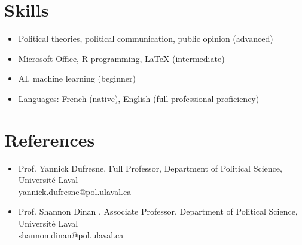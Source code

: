 \documentclass[11pt,letterpaper,sans]{moderncv}        %
\begin{document}
\section{Skills}
\begin{itemize}
  \item Political theories, political communication, public opinion (advanced)
  \item Microsoft Office, R programming, \LaTeX{} (intermediate)
  \item AI, machine learning (beginner)
  \item Languages: French (native), English (full professional proficiency)
\end{itemize}

\section{References}
\begin{itemize}
  \item Prof. Yannick Dufresne, Full Professor, Department of Political Science, Université Laval\\
         yannick.dufresne@pol.ulaval.ca
  \item Prof. Shannon Dinan , Associate Professor, Department of Political Science, Université Laval\\
 shannon.dinan@pol.ulaval.ca
\end{itemize}
\end{document}
